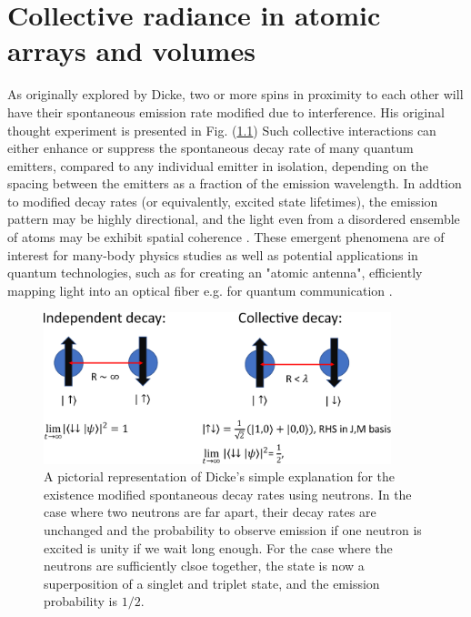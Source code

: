 \chapter{Collective radiance in atomic arrays and volumes}\label{ch:collectiveradiance}

As originally explored by Dicke, two or more spins in proximity to each other will have their spontaneous emission rate modified due to interference\cite{Dicke1954}. His original thought experiment is presented in Fig. (\ref{fig:DickeNeutronDecay}) Such collective interactions can either enhance or suppress the spontaneous decay rate of many quantum emitters, compared to any individual emitter in isolation, depending on the spacing between the emitters as a fraction of the emission wavelength. In addtion to modified decay rates (or equivalently, excited state lifetimes), the emission pattern may be highly directional\cite{ballantine2020subradiance}, and the light even from a disordered ensemble of atoms may be exhibit spatial coherence \cite{gold2022spatial}. These emergent phenomena are of interest for many-body physics studies as well as potential applications in quantum technologies, such as for creating an "atomic antenna", efficiently mapping light into an optical fiber e.g. for quantum communication \cite{grankin2018free, jones2020collectively}.

\begin{figure}[!ht]
    \centering
    \includegraphics[width=0.9\textwidth]{Images/Dicke_neutron_decay.pdf}
    \caption{A pictorial representation of Dicke's simple explanation for the existence modified spontaneous decay rates using neutrons. In the case where two neutrons are far apart, their decay rates are unchanged and the probability to observe emission if one neutron is excited is unity if we wait long enough. For the case where the neutrons are sufficiently clsoe together, the state is now a superposition of a singlet and triplet state, and the emission probability is $1/2$.}
    \label{fig:DickeNeutronDecay}
\end{figure}

